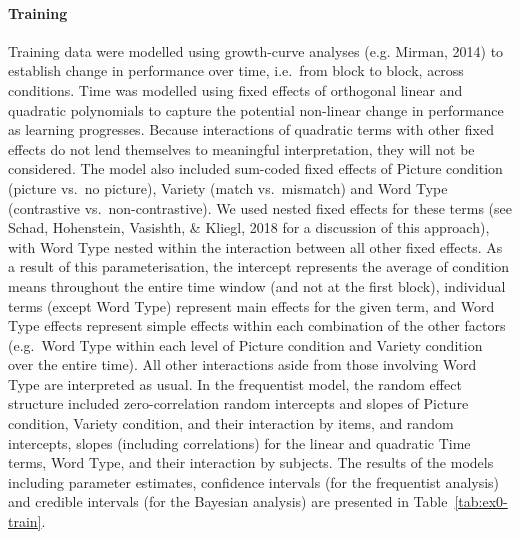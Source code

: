 \documentclass[doc,floatsintext]{apa6}
\let\oldparagraph\paragraph
\renewcommand{\paragraph}[1]{\oldparagraph{#1}\mbox{}}
\begin{document}
\paragraph{Training}\label{training}

Training data were modelled using growth-curve analyses (e.g. Mirman,
2014) to establish change in performance over time, i.e.~from block to
block, across conditions. Time was modelled using fixed effects of
orthogonal linear and quadratic polynomials to capture the potential
non-linear change in performance as learning progresses. Because
interactions of quadratic terms with other fixed effects do not lend
themselves to meaningful interpretation, they will not be considered.
The model also included sum-coded fixed effects of Picture condition
(picture vs.~no picture), Variety (match vs.~mismatch) and Word Type
(contrastive vs.~non-contrastive). We used nested fixed effects for
these terms (see Schad, Hohenstein, Vasishth, \& Kliegl, 2018 for a
discussion of this approach), with Word Type nested within the
interaction between all other fixed effects. As a result of this
parameterisation, the intercept represents the average of condition
means throughout the entire time window (and not at the first block),
individual terms (except Word Type) represent main effects for the given
term, and Word Type effects represent simple effects within each
combination of the other factors (e.g.~Word Type within each level of
Picture condition and Variety condition over the entire time). All other
interactions aside from those involving Word Type are interpreted as
usual. In the frequentist model, the random effect structure included
zero-correlation random intercepts and slopes of Picture condition,
Variety condition, and their interaction by items, and random
intercepts, slopes (including correlations) for the linear and quadratic
Time terms, Word Type, and their interaction by subjects. The results of
the models including parameter estimates, confidence intervals (for the
frequentist analysis) and credible intervals (for the Bayesian analysis)
are presented in Table~\ref{tab:ex0-train}.
\end{document}

